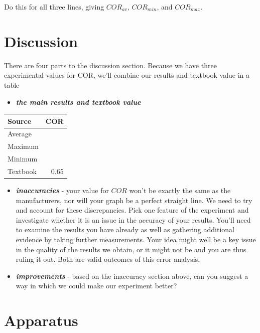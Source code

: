 \documentclass[
  letterpaper,
  DIV=11,
  numbers=noendperiod]{scrreprt}
\providecommand{\tightlist}{%
  \setlength{\itemsep}{0pt}\setlength{\parskip}{0pt}}\usepackage{longtable,booktabs,array}
\begin{document}
Do this for all three lines, giving \(COR_{av}\), \(COR_{min}\), and
\(COR_{max}\).

\section{Discussion}\label{discussion-5}

There are four parts to the discussion section. Because we have three
experimental values for COR, we'll combine our results and textbook
value in a table

\begin{itemize}
\tightlist
\item
  \textbf{\emph{the main results and textbook value}}
\end{itemize}

\begin{table}
\fontsize{12.0pt}{14.0pt}\selectfont
\begin{tabular*}{0.25\linewidth}{@{\extracolsep{\fill}}lr}
\toprule
Source & COR \\ 
\midrule\addlinespace[2.5pt]
Average &  \\ 
Maximum &  \\ 
Minimum &  \\ 
Textbook & 0.65 \\ 
\bottomrule
\end{tabular*}
\end{table}

\begin{itemize}
\item
  \textbf{\emph{inaccuracies}} - your value for \(COR\) won't be exactly
  the same as the manufacturers, nor will your graph be a perfect
  straight line. We need to try and account for these discrepancies.
  Pick one feature of the experiment and investigate whether it is an
  issue in the accuracy of your results. You'll need to examine the
  results you have already as well as gathering additional evidence by
  taking further measurements. Your idea might well be a key issue in
  the quality of the results we obtain, or it might not be and you are
  thus ruling it out. Both are valid outcomes of this error analysis.
\item
  \textbf{\emph{improvements}} - based on the inaccuracy section above,
  can you suggest a way in which we could make our experiment better?
\end{itemize}

\section{Apparatus}\label{apparatus-6}
\end{document}

